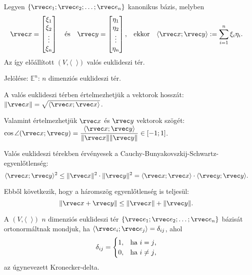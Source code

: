 \begin{definition}
  Legyen $\{ \rvec e_1; \rvec e_2; \ldots; \rvec e_n \}$ kanonikus bázis,
  melyben
  $$
    \rvec x = \begin{bmatrix}
      \xi_1  \\
      \xi_2  \\
      \vdots \\
      \xi_n
    \end{bmatrix}
    \quad\text{és}\quad
    \rvec y = \begin{bmatrix}
      \eta_1 \\
      \eta_2 \\
      \vdots \\
      \eta_n
    \end{bmatrix}
    \text,\quad\text{ekkor}\quad
    \langle \rvec x; \rvec y \rangle := \sum_{i=1}^{n} \xi_i \eta_i
    \text.
  $$
  Az így előállított $(V, \langle \phantom{x} \rangle)$ valós euklideszi tér.

  Jelölése: $\mathbb E^n$: $n$ dimenziós euklideszi tér.

  A valós euklideszi térben értelmezhetjük a vektorok hosszát:
  $\|\rvec x\| = \sqrt{\langle \rvec x; \rvec x \rangle}$.

  \vspace{.5em}
  Valamint értelmezhetjük $\rvec x$ és $\rvec y$ vektorok szögét:
  $\displaystyle
    \cos \angle(\rvec x; \rvec y)
    = \frac{\langle \rvec x; \rvec y \rangle}{\|\rvec x\| \|\rvec y\|}
    \in [-1;1]
  $.
\end{definition}

\begin{note}
  Valós euklideszi térekben érvényesek a
  Cauchy-Bunyakovszkij-Schwartz-egyen\-lőt\-len\-ség:
  $$
    \langle \rvec x; \rvec y \rangle^2
    \leq \|\rvec x\|^2 \cdot \|\rvec y\|^2
    = \langle \rvec x; \rvec x \rangle \cdot \langle \rvec y; \rvec y \rangle
    \text.
  $$

  Ebből következik, hogy a háromszög egyenlőtlenség is teljesül:
  $$
    \|\rvec x + \rvec y\| \leq \|\rvec x\| + \|\rvec y\|
    \text.
  $$
\end{note}

\begin{definition}
  A $(V, \langle \phantom{x} \rangle)$ $n$ dimenziós euklideszi tér
  $\{ \rvec e_1; \rvec e_2; \ldots; \rvec e_n \}$ bázisát
  ortonormáltnak mondjuk, ha $\langle \rvec e_i; \rvec e_j \rangle =
    \delta_{ij}$, ahol
  $$
    \delta_{ij} = \begin{cases}
      1, & \text{ha } i = j    \text, \\
      0, & \text{ha } i \neq j \text,
    \end{cases}
  $$
  az úgynevezett Kronecker-delta.
\end{definition}

